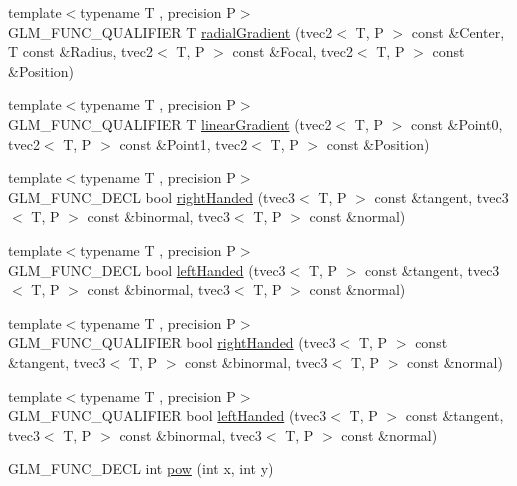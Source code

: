 \begin{DoxyCompactItemize}
\item 
{\footnotesize template$<$typename T , precision P$>$ }\\G\+L\+M\+\_\+\+F\+U\+N\+C\+\_\+\+Q\+U\+A\+L\+I\+F\+I\+E\+R T \hyperlink{group__gtx__gradient__paint_ga166d43d567a4cf150579a92f69b0dc9f}{radial\+Gradient} (tvec2$<$ T, P $>$ const \&Center, T const \&Radius, tvec2$<$ T, P $>$ const \&Focal, tvec2$<$ T, P $>$ const \&Position)
\item 
{\footnotesize template$<$typename T , precision P$>$ }\\G\+L\+M\+\_\+\+F\+U\+N\+C\+\_\+\+Q\+U\+A\+L\+I\+F\+I\+E\+R T \hyperlink{group__gtx__gradient__paint_gacde26d5e0c4a1856467bded9dfad9040}{linear\+Gradient} (tvec2$<$ T, P $>$ const \&Point0, tvec2$<$ T, P $>$ const \&Point1, tvec2$<$ T, P $>$ const \&Position)
\item 
{\footnotesize template$<$typename T , precision P$>$ }\\G\+L\+M\+\_\+\+F\+U\+N\+C\+\_\+\+D\+E\+C\+L bool \hyperlink{group__gtx__handed__coordinate__space_ga17cd83888de8755c0435c589fafd3603}{right\+Handed} (tvec3$<$ T, P $>$ const \&tangent, tvec3$<$ T, P $>$ const \&binormal, tvec3$<$ T, P $>$ const \&normal)
\item 
{\footnotesize template$<$typename T , precision P$>$ }\\G\+L\+M\+\_\+\+F\+U\+N\+C\+\_\+\+D\+E\+C\+L bool \hyperlink{group__gtx__handed__coordinate__space_ga7425e0ebfe6a56919900a072ae1f8017}{left\+Handed} (tvec3$<$ T, P $>$ const \&tangent, tvec3$<$ T, P $>$ const \&binormal, tvec3$<$ T, P $>$ const \&normal)
\item 
{\footnotesize template$<$typename T , precision P$>$ }\\G\+L\+M\+\_\+\+F\+U\+N\+C\+\_\+\+Q\+U\+A\+L\+I\+F\+I\+E\+R bool \hyperlink{group__gtx__handed__coordinate__space_ga17cd83888de8755c0435c589fafd3603}{right\+Handed} (tvec3$<$ T, P $>$ const \&tangent, tvec3$<$ T, P $>$ const \&binormal, tvec3$<$ T, P $>$ const \&normal)
\item 
{\footnotesize template$<$typename T , precision P$>$ }\\G\+L\+M\+\_\+\+F\+U\+N\+C\+\_\+\+Q\+U\+A\+L\+I\+F\+I\+E\+R bool \hyperlink{group__gtx__handed__coordinate__space_ga7425e0ebfe6a56919900a072ae1f8017}{left\+Handed} (tvec3$<$ T, P $>$ const \&tangent, tvec3$<$ T, P $>$ const \&binormal, tvec3$<$ T, P $>$ const \&normal)
\item 
G\+L\+M\+\_\+\+F\+U\+N\+C\+\_\+\+D\+E\+C\+L int \hyperlink{group__gtx__integer_ga9642514a44a67afa70966d756f040ca9}{pow} (int x, int y)

\end{DoxyCompactItemize}
